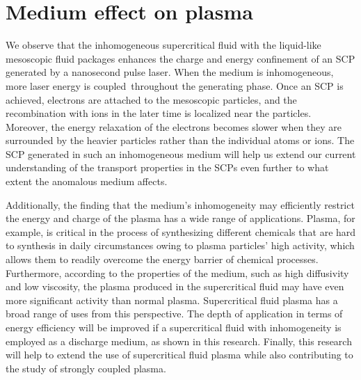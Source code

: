 \section{Medium effect on plasma}
\label{sec:ch4-5}

We observe that the inhomogeneous supercritical fluid with the liquid-like mesoscopic fluid packages enhances the charge and energy confinement of an SCP generated by a nanosecond pulse laser. When the medium is inhomogeneous, more laser energy is coupled throughout the generating phase. Once an SCP is achieved, electrons are attached to the mesoscopic particles, and the recombination with ions in the later time is localized near the particles. Moreover, the energy relaxation of the electrons becomes slower when they are surrounded by the heavier particles rather than the individual atoms or ions. The SCP generated in such an inhomogeneous medium will help us extend our current understanding of the transport properties in the SCPs even further to what extent the anomalous medium affects.

Additionally, the finding that the medium's inhomogeneity may efficiently restrict the energy and charge of the plasma has a wide range of applications. Plasma, for example, is critical in the process of synthesizing different chemicals that are hard to synthesis in daily circumstances owing to plasma particles' high activity, which allows them to readily overcome the energy barrier of chemical processes. Furthermore, according to the properties of the medium, such as high diffusivity and low viscosity, the plasma produced in the supercritical fluid may have even more significant activity than normal plasma. Supercritical fluid plasma has a broad range of uses from this perspective. The depth of application in terms of energy efficiency will be improved if a supercritical fluid with inhomogeneity is employed as a discharge medium, as shown in this research. Finally, this research will help to extend the use of supercritical fluid plasma while also contributing to the study of strongly coupled plasma.


